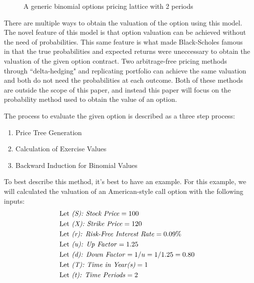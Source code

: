 \documentclass[12pt, letterpaper]{article}\usepackage{float}
\begin{document}
\begin{figure}[H]
  \caption{A generic binomial options pricing lattice with 2 periods}
  \label{fig:genericlattice}
\end{figure}

\pagebreak
There are multiple ways to obtain the valuation of the option using this model.
The novel feature of this model is that option valuation can be achieved without the need of probabilities.
This same feature is what made Black-Scholes famous in that the true probabilities and expected returns were uneccessary to obtain the valuation of the given option contract\cite{brigidavideo}.
Two arbitrage-free pricing methods through ``delta-hedging" and replicating portfolio can achieve the same valuation and both do not need the probabilities at each outcome.
Both of these methods are outside the scope of this paper, and instead this paper will focus on the probability method used to obtain the value of an option.

\bigskip

The process to evaluate the given option is described as a three step process\cite{bopmwikipedia}:
\begin{enumerate}[leftmargin=2\parindent]
  \item Price Tree Generation
  \item Calculation of Exercise Values
  \item Backward Induction for Binomial Values
\end{enumerate}

\bigskip

To best describe this method, it's best to have an example.
For this example, we will calculated the valuation of an American-style call option with the following inputs:
\begin{align*}
  \setlength{\jot}{20pt}
  \text{Let } &\text{\textit{(S): Stock Price}} = 100 \\
  \text{Let } &\text{\textit{(X): Strike Price}} = 120 \\
  \text{Let } &\text{\textit{(r): Risk-Free Interest Rate}} = 0.09\% \\
  \text{Let } &\text{\textit{(u): Up Factor}} = 1.25 \\
  \text{Let } &\text{\textit{(d): Down Factor}} = 1/u = 1/1.25 = 0.80 \\
  \text{Let } &\text{\textit{(T): Time in Year(s)}}  = 1 \\
  \text{Let } &\text{\textit{(t): Time Periods}}  = 2 
\end{align*}
\end{document}
